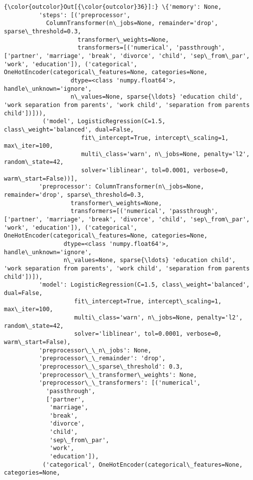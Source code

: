 \documentclass[11pt]{article}
\begin{document}
\begin{Verbatim}[commandchars=\\\{\}]
{\color{outcolor}Out[{\color{outcolor}36}]:} \{'memory': None,
          'steps': [('preprocessor',
            ColumnTransformer(n\_jobs=None, remainder='drop', sparse\_threshold=0.3,
                     transformer\_weights=None,
                     transformers=[('numerical', 'passthrough', ['partner', 'marriage', 'break', 'divorce', 'child', 'sep\_from\_par', 'work', 'education']), ('categorical', OneHotEncoder(categorical\_features=None, categories=None,
                   dtype=<class 'numpy.float64'>, handle\_unknown='ignore',
                   n\_values=None, sparse{\ldots} 'education child', 'work separation from parents', 'work child', 'separation from parents child'])])),
           ('model', LogisticRegression(C=1.5, class\_weight='balanced', dual=False,
                      fit\_intercept=True, intercept\_scaling=1, max\_iter=100,
                      multi\_class='warn', n\_jobs=None, penalty='l2', random\_state=42,
                      solver='liblinear', tol=0.0001, verbose=0, warm\_start=False))],
          'preprocessor': ColumnTransformer(n\_jobs=None, remainder='drop', sparse\_threshold=0.3,
                   transformer\_weights=None,
                   transformers=[('numerical', 'passthrough', ['partner', 'marriage', 'break', 'divorce', 'child', 'sep\_from\_par', 'work', 'education']), ('categorical', OneHotEncoder(categorical\_features=None, categories=None,
                 dtype=<class 'numpy.float64'>, handle\_unknown='ignore',
                 n\_values=None, sparse{\ldots} 'education child', 'work separation from parents', 'work child', 'separation from parents child'])]),
          'model': LogisticRegression(C=1.5, class\_weight='balanced', dual=False,
                    fit\_intercept=True, intercept\_scaling=1, max\_iter=100,
                    multi\_class='warn', n\_jobs=None, penalty='l2', random\_state=42,
                    solver='liblinear', tol=0.0001, verbose=0, warm\_start=False),
          'preprocessor\_\_n\_jobs': None,
          'preprocessor\_\_remainder': 'drop',
          'preprocessor\_\_sparse\_threshold': 0.3,
          'preprocessor\_\_transformer\_weights': None,
          'preprocessor\_\_transformers': [('numerical',
            'passthrough',
            ['partner',
             'marriage',
             'break',
             'divorce',
             'child',
             'sep\_from\_par',
             'work',
             'education']),
           ('categorical', OneHotEncoder(categorical\_features=None, categories=None,

\end{Verbatim}
\end{document}
